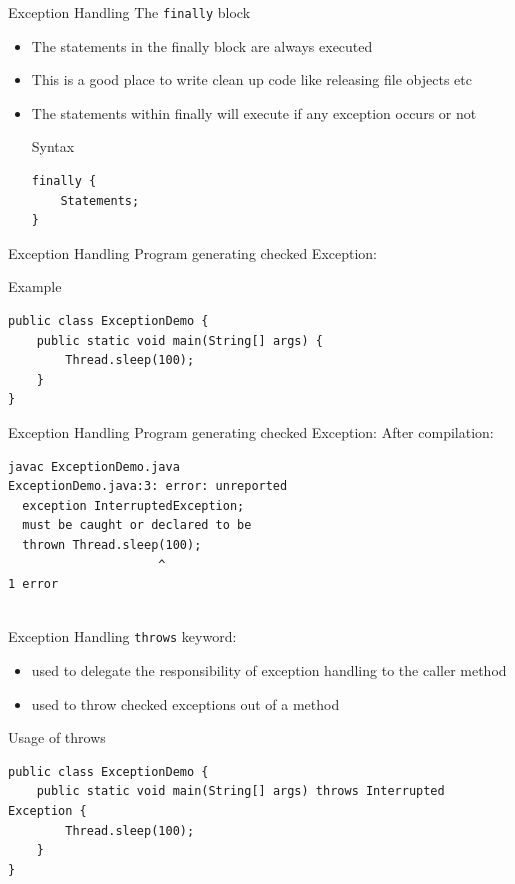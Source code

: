\documentclass[14pt]{beamer}
\begin{document}
\begin{frame}[fragile]{Exception Handling}
   The \lstinline!finally! block
   \begin{itemize}
    \item The statements in the finally block are always executed
    \item This is a good place to write clean up code like releasing file objects etc
   \item The statements within finally will execute if any exception occurs or not
  \begin{block}{Syntax}
   \begin{lstlisting}[numbers=none]
finally {
    Statements;
}  
   \end{lstlisting}

  \end{block}

 \end{itemize}
\end{frame}

\begin{frame}[fragile]{Exception Handling}
Program generating checked Exception:
\begin{block}{Example}
 \begin{lstlisting}
public class ExceptionDemo {
    public static void main(String[] args) {
        Thread.sleep(100);
    }
}
\end{lstlisting}

\end{block}
\end{frame}
\begin{frame}[fragile]{Exception Handling}
Program generating checked Exception:
After compilation:
\begin{verbatim}
javac ExceptionDemo.java 
ExceptionDemo.java:3: error: unreported 
  exception InterruptedException; 
  must be caught or declared to be 
  thrown Thread.sleep(100);
                     ^
1 error
  
\end{verbatim}
\end{frame}

\begin{frame}[fragile]{Exception Handling}
 \lstinline!throws! keyword:
 \begin{itemize}
  \item used to delegate the responsibility of exception handling to the caller method
  \item used to throw checked exceptions out of a method
 \end{itemize}
 \begin{block}{Usage of throws}
  \begin{lstlisting}
public class ExceptionDemo {
    public static void main(String[] args) throws Interrupted Exception {
        Thread.sleep(100);		
    }
}
\end{lstlisting}
 \end{block}
\end{frame}
\end{document}
